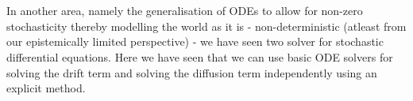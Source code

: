 \\\

In another area, namely the generalisation of ODEs to allow for non-zero stochasticity thereby modelling the world as it is - non-deterministic (atleast from our epistemically limited perspective) - we have seen two solver for stochastic differential equations. Here we have seen that we can use basic ODE solvers for solving the drift term and solving the diffusion term independently using an explicit method.